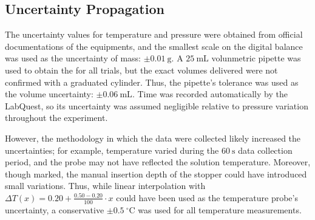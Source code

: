 \documentclass[hyphens]{article}
\begin{document}
\subsection{Uncertainty Propagation}
\label{sec:data-processing-uncertainty-propagation}
\indent \indent The uncertainty values for temperature and pressure were obtained from official documentations of the equipments, and the smallest scale on the digital balance was used as the uncertainty of mass: $\pm 0.01\ \text{g}$. A $25\ \text{mL}$ volunmetric pipette was used to obtain the  for all trials, but the exact volumes delivered were not confirmed with a graduated cylinder. Thus, the pipette's tolerance was used as the volume uncertainty: $\pm 0.06\ \text{mL}$. Time was recorded automatically by the LabQuest, so its uncertainty was assumed negligible relative to pressure variation throughout the experiment.

\begin{table}[H]
	\centering
	\caption{Uncertainty by tool.}
	\label{tab:data-processing-uncertainty-propagation-summary-of-uncertainties-by-tool}
\end{table}

However, the methodology in which the data were collected likely increased the uncertainties; for example, temperature varied during the $60\ \text{s}$ data collection period, and the probe may not have reflected the solution temperature. Moreover, though marked, the manual insertion depth of the stopper could have introduced small variations. Thus, while linear interpolation with $\Delta{T}(x) = 0.20 + \frac{0.50 - 0.20}{100} \cdot x$ could have been used as the temperature probe's uncertainty, a conservative $\pm 0.5\ ^\circ$C was used for all temperature measurements.
\end{document}
